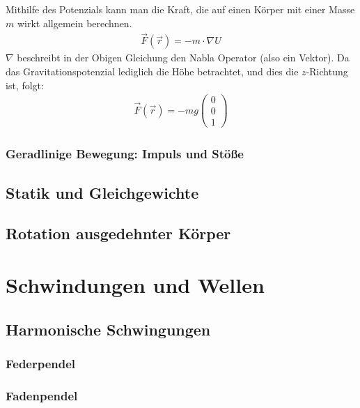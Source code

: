 \documentclass{article}
\begin{document}
Mithilfe des Potenzials kann man die Kraft, die auf einen Körper mit einer Masse $m$ wirkt allgemein berechnen.
\begin{align}
    \vec{F}(\vec{r})=-m\cdot \nabla U
\end{align}
$\nabla$ beschreibt in der Obigen Gleichung den Nabla Operator (also ein Vektor).
Da das Gravitationspotenzial lediglich die Höhe betrachtet, und dies die $z$-Richtung ist, folgt:
\begin{align}
    \vec{F}(\vec{r})=-mg\left(\begin{matrix}
        0\\0\\1
    \end{matrix}\right)
\end{align}

\subsubsection{Geradlinige Bewegung: Impuls und Stöße}










\newpage
\subsection{Statik und Gleichgewichte}
\subsection{Rotation ausgedehnter Körper}
\section{Schwindungen und Wellen}
\subsection{Harmonische Schwingungen}
\subsubsection{Federpendel}
\subsubsection{Fadenpendel}
\end{document}
